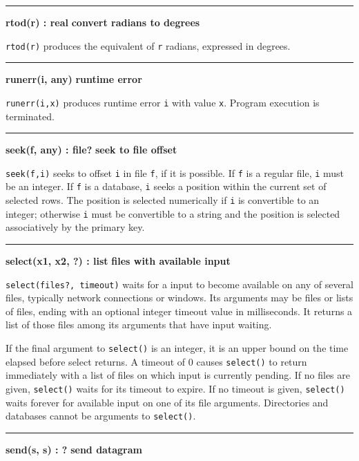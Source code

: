 \bigskip\hrule\vspace{0.1cm}
\noindent
{\bf rtod(r) : real } \hfill {\bf convert radians to degrees}

\noindent
{}\texttt{rtod(r)} produces the
equivalent of \texttt{r} radians, expressed in degrees.

\bigskip\hrule\vspace{0.1cm}
\noindent
{\bf runerr(i, any) } \hfill {\bf runtime error}

\noindent
{}\texttt{runerr(i,x)} produces runtime error
\texttt{i} with value \texttt{x}. Program execution is terminated.

\bigskip\hrule\vspace{0.1cm}
\noindent
{\bf seek(f, any) : file? } \hfill {\bf seek to file offset}

\noindent
{}\texttt{seek(f,i)} seeks to offset \texttt{i} in file
\texttt{f}, if it is possible. If \texttt{f} is a regular file,
\texttt{i} must be an integer. If \texttt{f} is a database, \texttt{i}
seeks a position within the current set of selected rows. The position
is selected numerically if \texttt{i} is convertible to an integer;
otherwise \texttt{i} must be convertible to a string and the position
is selected associatively by the primary key.

\bigskip\hrule\vspace{0.1cm}
\noindent
{\bf select(x1, x2, ?) : list } \hfill {\bf files with available input}

\noindent
\texttt{select(files?, timeout)} waits for a input to become available
on any of several files, typically network connections or windows. Its
arguments may be files or lists of files, ending with an optional
integer timeout value in milliseconds. It returns a list of those files
among its arguments that have input waiting.

If the final argument to \texttt{select()} is an
integer, it is an upper bound on the time elapsed before select
returns. A timeout of 0 causes \texttt{select()} to return immediately
with a list of files on which input is currently pending. If no files
are given, \texttt{select()} waits for its timeout to expire. If no
timeout is given, \texttt{select()} waits forever for available input
on one of its file arguments. Directories and databases cannot be
arguments to \texttt{select()}.

\bigskip\hrule\vspace{0.1cm}
\noindent
{\bf send(s, s) : ? } \hfill {\bf send datagram}

